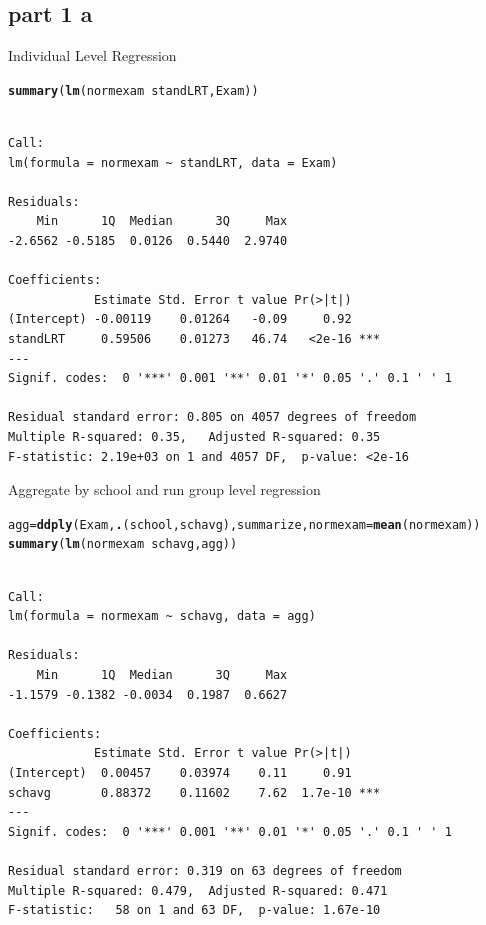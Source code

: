 \documentclass{article}\usepackage{graphicx, color}
\makeatletter
\newcommand{\hlfunctioncall}[1]{\textcolor[rgb]{0.501960784313725,0,0.329411764705882}{\textbf{#1}}}%
\newenvironment{kframe}{%
 \def\at@end@of@kframe{}%
 \ifinner\ifhmode%
  \def\at@end@of@kframe{\end{minipage}}%
  \begin{minipage}{\columnwidth}%
 \fi\fi%
 \def\FrameCommand##1{\hskip\@totalleftmargin \hskip-\fboxsep
 \colorbox{shadecolor}{##1}\hskip-\fboxsep
     \hskip-\linewidth \hskip-\@totalleftmargin \hskip\columnwidth}%
 \MakeFramed {\advance\hsize-\width
   \@totalleftmargin\z@ \linewidth\hsize
   \@setminipage}}%
 {\par\unskip\endMakeFramed%
 \at@end@of@kframe}
\newenvironment{knitrout}{}{} %
\makeatother
\begin{document}
\subsection*{part 1 a}
Individual Level Regression
\begin{knitrout}
\color{fgcolor}\begin{kframe}
\begin{alltt}
\hlfunctioncall{summary}(\hlfunctioncall{lm}(normexam~standLRT, Exam))
\end{alltt}
\begin{verbatim}

Call:
lm(formula = normexam ~ standLRT, data = Exam)

Residuals:
    Min      1Q  Median      3Q     Max 
-2.6562 -0.5185  0.0126  0.5440  2.9740 

Coefficients:
            Estimate Std. Error t value Pr(>|t|)    
(Intercept) -0.00119    0.01264   -0.09     0.92    
standLRT     0.59506    0.01273   46.74   <2e-16 ***
---
Signif. codes:  0 '***' 0.001 '**' 0.01 '*' 0.05 '.' 0.1 ' ' 1 

Residual standard error: 0.805 on 4057 degrees of freedom
Multiple R-squared: 0.35,	Adjusted R-squared: 0.35 
F-statistic: 2.19e+03 on 1 and 4057 DF,  p-value: <2e-16 
\end{verbatim}
\end{kframe}
\end{knitrout}

Aggregate by school and run group level regression
\begin{knitrout}
\color{fgcolor}\begin{kframe}
\begin{alltt}
agg=\hlfunctioncall{ddply}(Exam, \hlfunctioncall{.}(school,schavg), summarize, normexam=\hlfunctioncall{mean}(normexam))
\hlfunctioncall{summary}(\hlfunctioncall{lm}(normexam~schavg, agg))
\end{alltt}
\begin{verbatim}

Call:
lm(formula = normexam ~ schavg, data = agg)

Residuals:
    Min      1Q  Median      3Q     Max 
-1.1579 -0.1382 -0.0034  0.1987  0.6627 

Coefficients:
            Estimate Std. Error t value Pr(>|t|)    
(Intercept)  0.00457    0.03974    0.11     0.91    
schavg       0.88372    0.11602    7.62  1.7e-10 ***
---
Signif. codes:  0 '***' 0.001 '**' 0.01 '*' 0.05 '.' 0.1 ' ' 1 

Residual standard error: 0.319 on 63 degrees of freedom
Multiple R-squared: 0.479,	Adjusted R-squared: 0.471 
F-statistic:   58 on 1 and 63 DF,  p-value: 1.67e-10 
\end{verbatim}
\end{kframe}
\end{knitrout}
\end{document}
